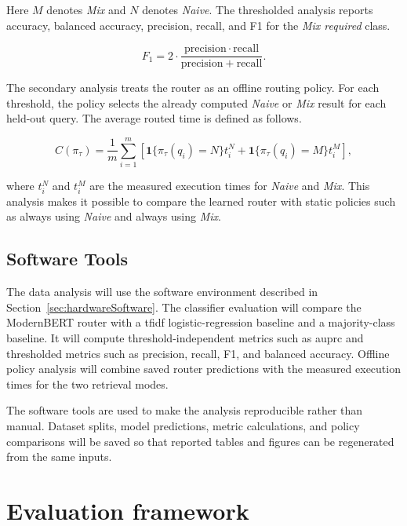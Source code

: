 \documentclass[english, bibtex]{kththesis}               %
\numberwithin{listing}{chapter}
\begin{document}
Here \(M\) denotes \emph{Mix} and \(N\) denotes \emph{Naive}. The thresholded analysis reports accuracy, balanced accuracy, precision, recall, and F1 for the \emph{Mix required} class.

\begin{equation}
\label{eq:f1}
F_1 =
2 \cdot
\frac{\mathrm{precision}\cdot\mathrm{recall}}
{\mathrm{precision}+\mathrm{recall}}.
\end{equation}

The secondary analysis treats the router as an offline routing policy. For each threshold, the policy selects the already computed \emph{Naive} or \emph{Mix} result for each held-out query. The average routed time is defined as follows.

\begin{equation}
\label{eq:averageRoutedTime}
C(\pi_\tau)=
\frac{1}{m}\sum_{i=1}^{m}
\left[
\mathbf{1}\{\pi_\tau(q_i)=N\}t_i^N+
\mathbf{1}\{\pi_\tau(q_i)=M\}t_i^M
\right],
\end{equation}

where \(t_i^N\) and \(t_i^M\) are the measured execution times for \emph{Naive} and \emph{Mix}. This analysis makes it possible to compare the learned router with static policies such as always using \emph{Naive} and always using \emph{Mix}.

\subsection{Software Tools}
\label{sec:softwareTools}

The data analysis will use the software environment described in Section~\ref{sec:hardwareSoftware}. The classifier evaluation will compare the ModernBERT router with a \gls{tfidf} logistic-regression baseline and a majority-class baseline. It will compute threshold-independent metrics such as \gls{auprc} and thresholded metrics such as precision, recall, F1, and balanced accuracy. Offline policy analysis will combine saved router predictions with the measured execution times for the two retrieval modes.

The software tools are used to make the analysis reproducible rather than manual. Dataset splits, model predictions, metric calculations, and policy comparisons will be saved so that reported tables and figures can be regenerated from the same inputs.


\section{Evaluation framework}
\label{sec:evaluationFramework}
\end{document}
